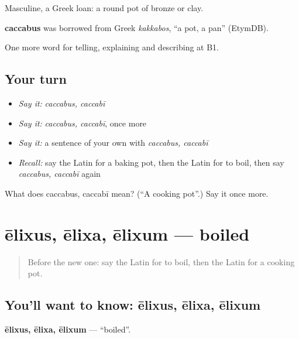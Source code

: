 Masculine, a Greek loan: a round pot of bronze or clay.

\begin{cousinweb}
\textbf{caccabus} was borrowed from Greek \emph{kakkabos}, \textquotedblleft{}a pot, a pan\textquotedblright{} (EtymDB).
\end{cousinweb}

\begin{grammarlens}[title={What you've built}]
One more word for telling, explaining and describing at B1.
\end{grammarlens}

\subsection*{Your turn}
\begin{itemize}
\raggedright
  \item \emph{Say it:} \emph{caccabus, caccabī}
  \item \emph{Say it:} \emph{caccabus, caccabī}, once more
  \item \emph{Say it:} a sentence of your own with \emph{caccabus, caccabī}
  \item \emph{Recall:} say the Latin for a baking pot, then the Latin for to boil, then say \emph{caccabus, caccabī} again
\end{itemize}

\begin{tcolorbox}[breakable,colback=teal!4,colframe=teal!35!black,title={Before you move on}]
What does caccabus, caccabī mean? (\textquotedblleft{}A cooking pot\textquotedblright{}.) Say it once more.
\end{tcolorbox}
\section[ēlixus, ēlixa, ēlixum]{ēlixus, ēlixa, ēlixum — boiled}

\label{lesson:LA-C353-elixus}



\begin{quote}
Before the new one: say the Latin for to boil, then the Latin for a cooking pot.
\end{quote}

\subsection*{You'll want to know: ēlixus, ēlixa, ēlixum}
\textbf{ēlixus, ēlixa, ēlixum} — \textquotedblleft{}boiled\textquotedblright{}.

